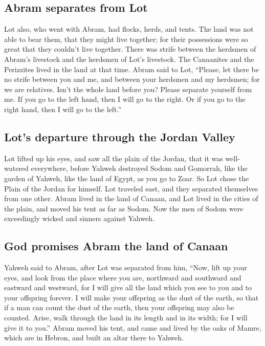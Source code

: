 \hypertarget{abram-separates-from-lot}{%
\subsection{Abram separates from Lot}\label{abram-separates-from-lot}}

 Lot also, who went with Abram, had flocks, herds, and
tents.  The land was not able to bear them, that they
might live together; for their possessions were so great that they
couldn't live together.  There was strife between the
herdsmen of Abram's livestock and the herdsmen of Lot's livestock. The
Canaanites and the Perizzites lived in the land at that time.
 Abram said to Lot, ``Please, let there be no strife
between you and me, and between your herdsmen and my herdsmen; for we
are relatives.  Isn't the whole land before you? Please
separate yourself from me. If you go to the left hand, then I will go to
the right. Or if you go to the right hand, then I will go to the left.''

\hypertarget{lots-departure-through-the-jordan-valley}{%
\subsection{Lot's departure through the Jordan
Valley}\label{lots-departure-through-the-jordan-valley}}

 Lot lifted up his eyes, and saw all the plain of the
Jordan, that it was well-watered everywhere, before Yahweh destroyed
Sodom and Gomorrah, like the garden of Yahweh, like the land of Egypt,
as you go to Zoar.  So Lot chose the Plain of the Jordan
for himself. Lot traveled east, and they separated themselves from one
other.  Abram lived in the land of Canaan, and Lot lived
in the cities of the plain, and moved his tent as far as Sodom.
 Now the men of Sodom were exceedingly wicked and sinners
against Yahweh.

\hypertarget{god-promises-abram-the-land-of-canaan}{%
\subsection{God promises Abram the land of
Canaan}\label{god-promises-abram-the-land-of-canaan}}

 Yahweh said to Abram, after Lot was separated from him,
``Now, lift up your eyes, and look from the place where you are,
northward and southward and eastward and westward,  for I
will give all the land which you see to you and to your offspring
forever.  I will make your offspring as the dust of the
earth, so that if a man can count the dust of the earth, then your
offspring may also be counted.  Arise, walk through the
land in its length and in its width; for I will give it to you.''
 Abram moved his tent, and came and lived by the oaks of
Mamre, which are in Hebron, and built an altar there to Yahweh.

